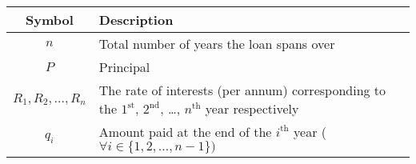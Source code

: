 \begin{tabular}{|c|p{5.4cm}|}
    \hline
        \textbf{Symbol} & \textbf{Description}  \\
    \hline
        $n$ & Total number of years the loan spans over\\
    \hline
        $P$ & Principal\\
    \hline
        $R_1, R_2, \ldots, R_n$ &  The rate of interests (per annum) corresponding to the $1^\text{st}$, $2^\text{nd}$, \ldots, $n^\text{th}$ year respectively\\
    \hline
        $q_i$ & Amount paid at the end of the  $i^\text{th}$ year ( $\forall i\in \{1,2,\ldots,n-1\})$\\
    \hline
    \end{tabular}
